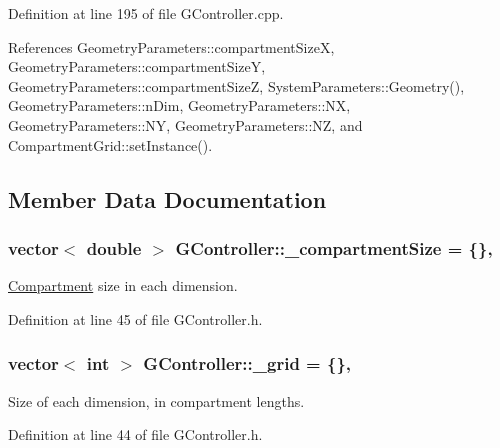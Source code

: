 Definition at line 195 of file G\+Controller.\+cpp.



References Geometry\+Parameters\+::compartment\+Size\+X, Geometry\+Parameters\+::compartment\+Size\+Y, Geometry\+Parameters\+::compartment\+Size\+Z, System\+Parameters\+::\+Geometry(), Geometry\+Parameters\+::n\+Dim, Geometry\+Parameters\+::\+N\+X, Geometry\+Parameters\+::\+N\+Y, Geometry\+Parameters\+::\+N\+Z, and Compartment\+Grid\+::set\+Instance().



\subsection{Member Data Documentation}
\hypertarget{classGController_a26bdd8b8d1667decda74bedf7bf25800}{
\subsubsection[{\+\_\+compartment\+Size}]{\setlength{\rightskip}{0pt plus 5cm}vector$<$ double $>$ G\+Controller\+::\+\_\+compartment\+Size = \{\}\hspace{0.3cm}{\ttfamily [static]}, {\ttfamily [private]}}}\label{classGController_a26bdd8b8d1667decda74bedf7bf25800}


\hyperlink{classCompartment}{Compartment} size in each dimension. 



Definition at line 45 of file G\+Controller.\+h.

\hypertarget{classGController_a2134b6522abe94d25206060b9684d265}{
\subsubsection[{\+\_\+grid}]{\setlength{\rightskip}{0pt plus 5cm}vector$<$ int $>$ G\+Controller\+::\+\_\+grid = \{\}\hspace{0.3cm}{\ttfamily [static]}, {\ttfamily [private]}}}\label{classGController_a2134b6522abe94d25206060b9684d265}


Size of each dimension, in compartment lengths. 



Definition at line 44 of file G\+Controller.\+h.

